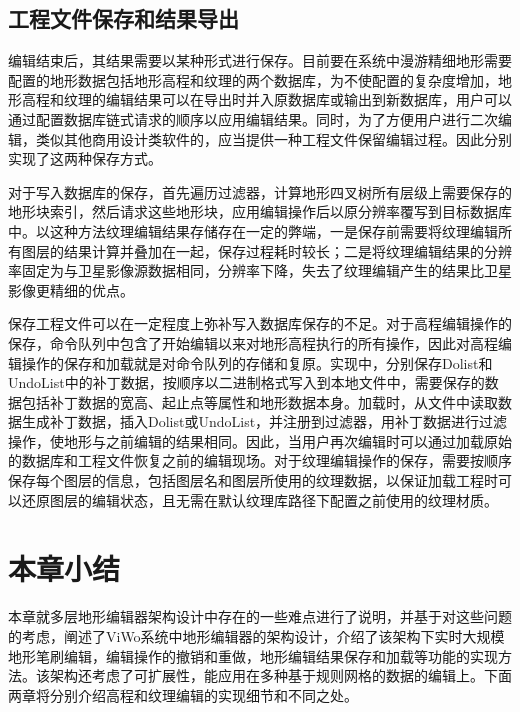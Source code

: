 \subsection{工程文件保存和结果导出}
编辑结束后，其结果需要以某种形式进行保存。目前要在系统中漫游精细地形需要配置的地形数据包括地形高程和纹理的两个数据库，为不使配置的复杂度增加，地形高程和纹理的编辑结果可以在导出时并入原数据库或输出到新数据库，用户可以通过配置数据库链式请求的顺序以应用编辑结果。同时，为了方便用户进行二次编辑，类似其他商用设计类软件的，应当提供一种工程文件保留编辑过程。因此分别实现了这两种保存方式。\par
对于写入数据库的保存，首先遍历过滤器，计算地形四叉树所有层级上需要保存的地形块索引，然后请求这些地形块，应用编辑操作后以原分辨率覆写到目标数据库中。以这种方法纹理编辑结果存储存在一定的弊端，一是保存前需要将纹理编辑所有图层的结果计算并叠加在一起，保存过程耗时较长；二是将纹理编辑结果的分辨率固定为与卫星影像源数据相同，分辨率下降，失去了纹理编辑产生的结果比卫星影像更精细的优点。\par
保存工程文件可以在一定程度上弥补写入数据库保存的不足。对于高程编辑操作的保存，命令队列中包含了开始编辑以来对地形高程执行的所有操作，因此对高程编辑操作的保存和加载就是对命令队列的存储和复原。实现中，分别保存Dolist和UndoList中的补丁数据，按顺序以二进制格式写入到本地文件中，需要保存的数据包括补丁数据的宽高、起止点等属性和地形数据本身。加载时，从文件中读取数据生成补丁数据，插入Dolist或UndoList，并注册到过滤器，用补丁数据进行过滤操作，使地形与之前编辑的结果相同。因此，当用户再次编辑时可以通过加载原始的数据库和工程文件恢复之前的编辑现场。对于纹理编辑操作的保存，需要按顺序保存每个图层的信息，包括图层名和图层所使用的纹理数据，以保证加载工程时可以还原图层的编辑状态，且无需在默认纹理库路径下配置之前使用的纹理材质。\par


\section{本章小结}
本章就多层地形编辑器架构设计中存在的一些难点进行了说明，并基于对这些问题的考虑，阐述了ViWo系统中地形编辑器的架构设计，介绍了该架构下实时大规模地形笔刷编辑，编辑操作的撤销和重做，地形编辑结果保存和加载等功能的实现方法。该架构还考虑了可扩展性，能应用在多种基于规则网格的数据的编辑上。下面两章将分别介绍高程和纹理编辑的实现细节和不同之处。
